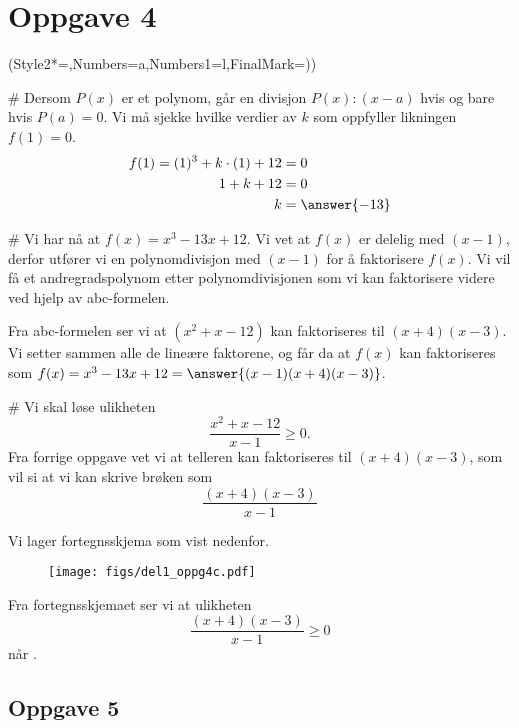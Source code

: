 \section*{Oppgave 4}
\begin{easylist}[enumerate]
	\ListProperties(Style2*=,Numbers=a,Numbers1=l,FinalMark={)})
	
	# Dersom $P(x)$ er et polynom, går en divisjon $P(x) : (x-a)$ hvis og bare hvis $P(a) = 0$. 
	Vi må sjekke hvilke verdier av $k$ som oppfyller likningen $f(1)= 0$.
	\begin{align*}
		f(1) = (1)^3 + k \cdot (1) + 12 &= 0 \\
		1+k+12 & =0 \\
		k & =  \answer{-13}
	\end{align*}
	
	# Vi har nå at $f(x) = x^3 - 13x + 12$. 
	Vi vet at $f(x)$ er delelig med $(x-1)$, derfor utfører vi en polynomdivisjon med $(x-1)$ for å faktorisere $f(x)$. 
	Vi vil få et andregradspolynom etter polynomdivisjonen som vi kan faktorisere videre ved hjelp av abc-formelen. 
	\newline
	\newline
	
	Fra abc-formelen ser vi at $(x^2 + x - 12)$ kan faktoriseres til $(x+4)(x-3)$. 
	Vi setter sammen alle de lineære faktorene, og får da at $f(x)$ kan faktoriseres som 
	$f(x) = x^3 - 13x + 12 = \answer{(x-1)(x+4)(x-3)}$.
	
	# Vi skal løse ulikheten
	\begin{equation*}
		\frac{x^2 + x -12}{x-1} \geq 0.
	\end{equation*}
	Fra forrige oppgave vet vi at telleren kan faktoriseres til $(x+4)(x-3)$, som vil si at vi kan skrive brøken som $$\frac{(x+4)(x-3)}{x-1}$$
	
	Vi lager fortegnsskjema som vist nedenfor.
	\begin{figure}[ht!]
		\centering
		\texttt{[image: figs/del1\_oppg4c.pdf]}
		\label{fig:del1_oppg4c}
	\end{figure}
	
	Fra fortegnsskjemaet ser vi at ulikheten
	\begin{equation*}
		\frac{(x+4)(x-3)}{x-1} \geq 0
	\end{equation*}
	når .
	
\end{easylist}

\subsection*{Oppgave 5}

